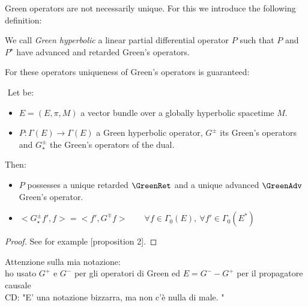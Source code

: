 \documentclass[Main]{subfiles}
\begin{document}
			Green operators are not necessarily unique. For this we introduce the following definition:
			\begin{definition}
				We call \emph{Green hyperbolic} a
				linear partial differential operator $P$
				such that $P$ and $P^\star$ have advanced and retarded Green’s operators.
			\end{definition}
			For these operators uniqueness of Green's operators is guaranteed:
			\begin{theorem}\label{Teo:GreenHypCharacter}
				$ $
					Let be:
					\begin{itemize}
						\item $E=(E,\pi,M)$ a vector bundle over a globally hyperbolic spacetime $M$.
						\item $P:\Gamma(E) \rightarrow \Gamma(E)$ a Green hyperbolic operator, $G^\pm$ its Green's operators and $G_\star^\pm$ the Green's operators of the dual.
					\end{itemize}
					Then:
					\begin{itemize}
					\item $P$ possesses a unique retarded $\GreenRet$ and a unique advanced $\GreenAdv$ Green's operator.
					\item $<G_\star^\pm f', f> = <f', G^\mp f > \qquad \forall f \in \Gamma_0(E),\: \forall f' \in \Gamma_0(E^*)$
					\end{itemize}
			\end{theorem}
			\begin{proof}
			See for example \cite{Benini}[proposition 2].
			\end{proof}

\ifToninus
	\begin{Warning}
		Attenzione sulla mia notazione:\\
		ho usato $G^+$ e $G^-$ per gli operatori di Green ed $E= G^- - G^+$ per il propagatore causale\\
		CD: "E' una notazione bizzarra, ma non c'è nulla di male. "
	\end{Warning}
\fi
\end{document}
